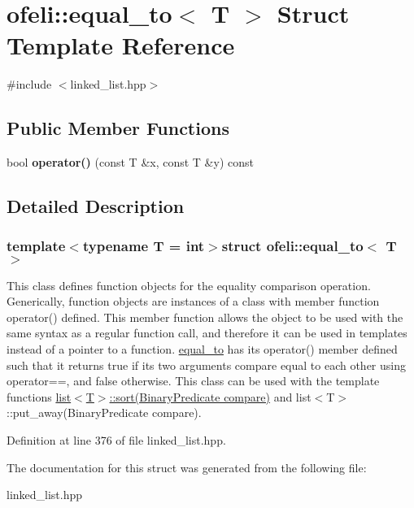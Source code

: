 \hypertarget{structofeli_1_1equal__to}{\section{ofeli\-:\-:equal\-\_\-to$<$ T $>$ Struct Template Reference}
\label{structofeli_1_1equal__to}
}


{\ttfamily \#include $<$linked\-\_\-list.\-hpp$>$}

\subsection*{Public Member Functions}
\begin{DoxyCompactItemize}
\item 
\hypertarget{structofeli_1_1equal__to_a27b12a625a6eb0955bc710c57882d24c}{bool {\bfseries operator()} (const T \&x, const T \&y) const }\label{structofeli_1_1equal__to_a27b12a625a6eb0955bc710c57882d24c}

\end{DoxyCompactItemize}


\subsection{Detailed Description}
\subsubsection*{template$<$typename T = int$>$struct ofeli\-::equal\-\_\-to$<$ T $>$}

This class defines function objects for the equality comparison operation. Generically, function objects are instances of a class with member function {\ttfamily operator()} defined. This member function allows the object to be used with the same syntax as a regular function call, and therefore it can be used in templates instead of a pointer to a function. {\ttfamily \hyperlink{structofeli_1_1equal__to}{equal\-\_\-to}} has its {\ttfamily operator()} member defined such that it returns {\ttfamily true} if its two arguments compare equal to each other using {\ttfamily operator==}, and {\ttfamily false} otherwise. This class can be used with the template functions {\ttfamily \hyperlink{classofeli_1_1list_aaeedac18b70d233644d84c7ad3a9a3fa}{list$<$\-T$>$\-::sort(\-Binary\-Predicate compare)}} and list$<$\-T$>$\-::put\-\_\-away(\-Binary\-Predicate compare). 

Definition at line 376 of file linked\-\_\-list.\-hpp.



The documentation for this struct was generated from the following file\-:\begin{DoxyCompactItemize}
\item 
linked\-\_\-list.\-hpp\end{DoxyCompactItemize}
